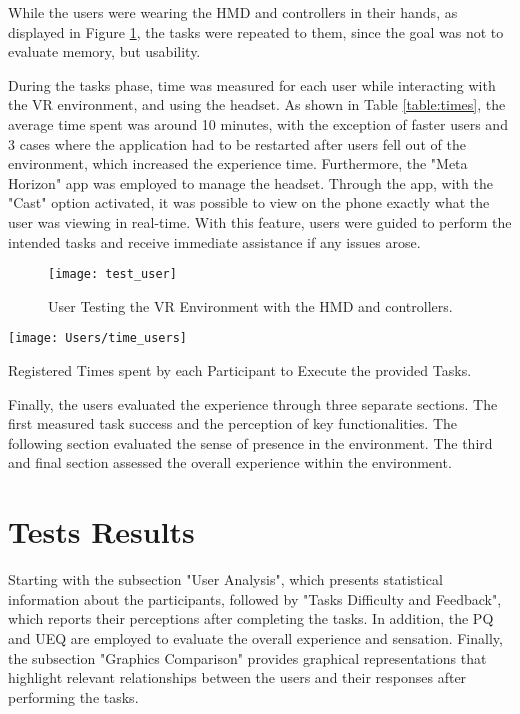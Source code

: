 While the users were wearing the \gls{HMD} and controllers in their hands, as displayed in Figure \ref{fig:user}, the tasks were repeated to them, since the goal was not to evaluate memory, but usability.

During the tasks phase, time was measured for each user while interacting with the \gls{VR} environment, and using the headset. 
As shown in Table \ref{table:times}, the average time spent was around 10 minutes, with the exception of faster users and 3 cases where the application had to be restarted after users fell out of the environment, which increased the experience time.
Furthermore, the "Meta Horizon" app was employed to manage the headset. Through the app, with the "Cast" option activated, it was possible to view on the phone exactly what the user was viewing in real-time. 
With this feature, users were guided to perform the intended tasks and receive immediate assistance if any issues arose. 

\begin{figure}[h!]
    \centering
    \texttt{[image: test\_user]}
    \caption{User Testing the \gls{VR} Environment with the \gls{HMD} and controllers.} 
    \label{fig:user}
\end{figure}

\begin{table}[h!]
    \centering
    \texttt{[image: Users/time\_users]}
    \caption{Registered Times spent by each Participant to Execute the provided Tasks.} 
    \label{table:times}
\end{table}

Finally, the users evaluated the experience through three separate sections. The first measured task success and the perception of key functionalities.
The following section evaluated the sense of presence in the environment. The third and final section assessed the overall experience within the environment.



\section{Tests Results}
\label{sec:results}

Starting with the subsection "User Analysis", which presents statistical information about the participants, followed by "Tasks Difficulty and Feedback", which reports their perceptions after completing the tasks.
In addition, the \gls{PQ} and \gls{UEQ} are employed to evaluate the overall experience and sensation. Finally, the subsection "Graphics Comparison" provides graphical representations that highlight relevant relationships between the users and their responses after performing the tasks.
